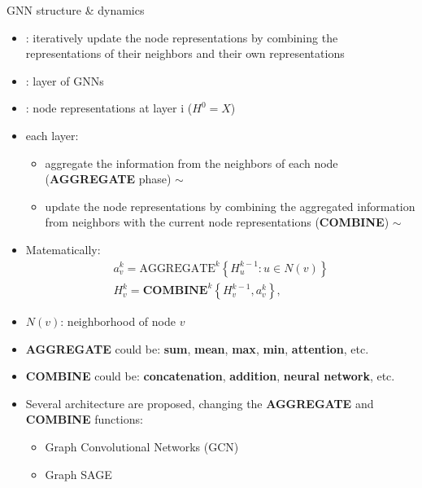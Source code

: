 \documentclass[presentation, 9pt]{beamer}\mode<presentation>{\usetheme{AMSBolognaFC}}
\begin{document}
\begin{frame}{GNN structure \& dynamics}
	\begin{itemize}
		\item {}: iteratively update the node representations 
		by combining the representations of their neighbors and their own representations
		\item {}: layer of GNNs
		\item {}: node representations at layer i ($H^0 = X$)
		\item each layer:
		\begin{itemize}
			\item aggregate the information from the neighbors of each node (\textbf{AGGREGATE} phase) $\sim$ 
			\item update the node representations by combining the aggregated information from neighbors with the current node representations (\textbf{COMBINE}) $\sim$ 
		\end{itemize}
		\item Matematically:
			$$
			\begin{array}{l}
			a_v^k=\text{AGGREGATE}^k\left\{H_u^{k-1}: u \in N(v)\right\} \\
			H_v^k=\mathbf{COMBINE}^k\left\{H_v^{k-1}, a_v^k\right\},
			\end{array}
			$$
		\item $N(v)$: neighborhood of node $v$
		\item \textbf{AGGREGATE} could be: \textbf{sum}, \textbf{mean}, \textbf{max}, \textbf{min}, \textbf{attention}, etc.
		\item \textbf{COMBINE} could be: \textbf{concatenation}, \textbf{addition}, \textbf{neural network}, etc.
		\item Several architecture are proposed, changing the \textbf{AGGREGATE} and \textbf{COMBINE} functions:
		\begin{itemize}
			\item Graph Convolutional Networks (GCN)~
			\item Graph SAGE~
		\end{itemize}
	\end{itemize}
\end{frame}
\end{document}
